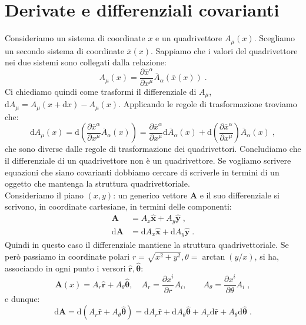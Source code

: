 \documentclass[12pt,a4paper]{report}
\theoremstyle{definition}
\newcommand{\diff}[1][]{\mathrm{d}#1}
\begin{document}
\section{Derivate e differenziali covarianti}
Consideriamo un sistema di coordinate $x$ e un quadrivettore $A_{\mu}(x)$. Scegliamo un secondo sistema di coordinate $\overline{x}(x)$. Sappiamo che i valori del quadrivettore nei due sistemi sono collegati dalla relazione:
$$
A_{\mu}(x)=\frac{\partial\overline{x}^{\alpha}}{\partial x^{\mu}}\overline{A}_{\alpha}(\overline{x}(x))\;.
$$
Ci chiediamo quindi come trasformi il differenziale di $A_{\mu}$, $\diff{A_{\mu}}=A_{\mu}(x+\diff{x})-A_{\mu}(x)$. Applicando le regole di trasformazione troviamo che:
\begin{equation}
\diff{A_{\mu}(x)}=\diff\left(\frac{\partial\overline{x}^{\alpha}}{\partial x^{\mu}}\overline{A}_{\alpha}(x)\right)=
\frac{\partial\overline{x}^{\alpha}}{\partial x^{\mu}}\diff{\overline{A}_{\alpha}(x)}+\diff\left(\frac{\partial \overline{x}^{\alpha}}{\partial x^{\mu}}\right)\overline{A}_{\alpha}(x)\;,
\end{equation}
che sono diverse dalle regole di trasformazione dei quadrivettori. Concludiamo che il differenziale di un quadrivettore non è un quadrivettore. Se vogliamo scrivere equazioni che siano covarianti dobbiamo cercare di scriverle in termini di un oggetto che mantenga la struttura quadrivettoriale. \\
Consideriamo il piano $(x,y)$: un generico vettore $\mathbf{A}$ e il suo differenziale si scrivono, in coordinate cartesiane, in termini delle componenti:
\begin{align*}
\mathbf{A}&=A_x\hat{\mathbf{x}}+A_y\hat{\mathbf{y}}\;, \\
\diff{\mathbf{A}}&=\diff{A_x}\hat{\mathbf{x}}+\diff{A_y}\hat{\mathbf{y}}\;.
\end{align*}
Quindi in questo caso il differenziale mantiene la struttura quadrivettoriale. Se però passiamo in coordinate polari $r=\sqrt{x^2+y^2}, \theta=\arctan(y/x)$, si ha, associando in ogni punto i versori $\hat{\mathbf{r}},\hat{\boldsymbol{\theta}}$:
$$
\mathbf{A}(x)=A_r\hat{\mathbf{r}}+A_{\theta}\hat{\boldsymbol{\theta}},\quad A_r=\frac{\partial x^i}{\partial r}A_i,\qquad A_{\theta}=\frac{\partial x^i}{\partial\theta}A_i\;,
$$
e dunque:
\begin{equation}
\diff{\mathbf{A}}=\diff{(A_r\hat{\mathbf{r}}+A_{\theta}\hat{\boldsymbol{\theta}})}= \diff{A_r}\hat{\mathbf{r}}+\diff{A_{\theta}}\hat{\boldsymbol{\theta}}+A_r\diff{\hat{\mathbf{r}}}+A_{\theta}\diff{\hat{ 
\boldsymbol{\theta}}}\;.
\end{equation}
\end{document}

